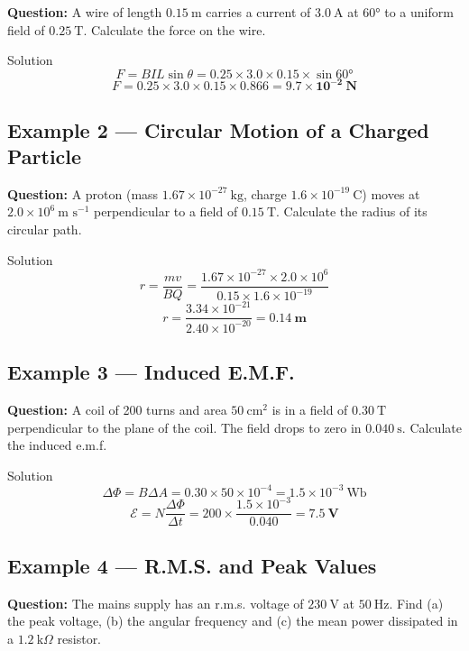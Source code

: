 \textbf{Question:} A wire of length $0.15\ \text{m}$ carries a current of $3.0\ \text{A}$ at $60°$ to a uniform field of $0.25\ \text{T}$. Calculate the force on the wire.

\begin{examplebox}{Solution}
$$F = BIL\sin\theta = 0.25 \times 3.0 \times 0.15 \times \sin 60°$$
$$F = 0.25 \times 3.0 \times 0.15 \times 0.866 = \mathbf{9.7\times10^{-2}\ \text{N}}$$
\end{examplebox}

\subsection*{Example 2 — Circular Motion of a Charged Particle}

\textbf{Question:} A proton (mass $1.67\times10^{-27}\ \text{kg}$, charge $1.6\times10^{-19}\ \text{C}$) moves at $2.0\times10^6\ \text{m s}^{-1}$ perpendicular to a field of $0.15\ \text{T}$. Calculate the radius of its circular path.

\begin{examplebox}{Solution}
$$r = \frac{mv}{BQ} = \frac{1.67\times10^{-27} \times 2.0\times10^6}{0.15 \times 1.6\times10^{-19}}$$
$$r = \frac{3.34\times10^{-21}}{2.40\times10^{-20}} = \mathbf{0.14\ \text{m}}$$
\end{examplebox}

\subsection*{Example 3 — Induced E.M.F.}

\textbf{Question:} A coil of 200 turns and area $50\ \text{cm}^2$ is in a field of $0.30\ \text{T}$ perpendicular to the plane of the coil. The field drops to zero in $0.040\ \text{s}$. Calculate the induced e.m.f.

\begin{examplebox}{Solution}
$$\Delta\Phi = B\Delta A = 0.30 \times 50\times10^{-4} = 1.5\times10^{-3}\ \text{Wb}$$
$$\mathcal{E} = N\frac{\Delta\Phi}{\Delta t} = 200 \times \frac{1.5\times10^{-3}}{0.040} = \mathbf{7.5\ \text{V}}$$
\end{examplebox}

\subsection*{Example 4 — R.M.S. and Peak Values}

\textbf{Question:} The mains supply has an r.m.s. voltage of $230\ \text{V}$ at $50\ \text{Hz}$. Find (a) the peak voltage, (b) the angular frequency and (c) the mean power dissipated in a $1.2\ \text{k}\Omega$ resistor.

